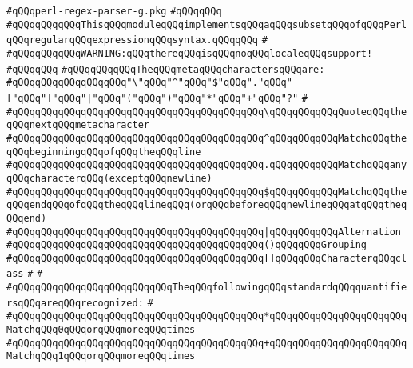 \label{src/lib/regex/front/perl-regex-parser-g.pkg}
\verb|#qQQqperl-regex-parser-g.pkg|\newline
\verb|#qQQqqQQq|\newline
\verb|#qQQqqQQqqQQqThisqQQqmoduleqQQqimplementsqQQqaqQQqsubsetqQQqofqQQqPerlqQQqregularqQQqexpressionqQQqsyntax.qQQqqQQq|\newline
\verb|#|\newline
\verb|#qQQqqQQqqQQqWARNING:qQQqthereqQQqisqQQqnoqQQqlocaleqQQqsupport!|\newline
\verb|#qQQqqQQq|\newline
\verb|#qQQqqQQqqQQqTheqQQqmetaqQQqcharactersqQQqare:|\newline
\verb|#qQQqqQQqqQQqqQQqqQQq"\"qQQq"^"qQQq"$"qQQq"."qQQq"["qQQq"]"qQQq"|\verb#|"qQQq"("qQQq")"qQQq"*"qQQq"+"qQQq"?"#\newline
\verb|#|\newline
\verb|#qQQqqQQqqQQqqQQqqQQqqQQqqQQqqQQqqQQqqQQqqQQq\qQQqqQQqqQQqQuoteqQQqtheqQQqnextqQQqmetacharacter|\newline
\verb|#qQQqqQQqqQQqqQQqqQQqqQQqqQQqqQQqqQQqqQQqqQQq^qQQqqQQqqQQqMatchqQQqtheqQQqbeginningqQQqofqQQqtheqQQqline|\newline
\verb|#qQQqqQQqqQQqqQQqqQQqqQQqqQQqqQQqqQQqqQQqqQQq.qQQqqQQqqQQqMatchqQQqanyqQQqcharacterqQQq(exceptqQQqnewline)|\newline
\verb|#qQQqqQQqqQQqqQQqqQQqqQQqqQQqqQQqqQQqqQQqqQQq$qQQqqQQqqQQqMatchqQQqtheqQQqendqQQqofqQQqtheqQQqlineqQQq(orqQQqbeforeqQQqnewlineqQQqatqQQqtheqQQqend)|\newline
\verb|#qQQqqQQqqQQqqQQqqQQqqQQqqQQqqQQqqQQqqQQqqQQq|\verb#|qQQqqQQqqQQqAlternation#\newline
\verb|#qQQqqQQqqQQqqQQqqQQqqQQqqQQqqQQqqQQqqQQqqQQq()qQQqqQQqGrouping|\newline
\verb|#qQQqqQQqqQQqqQQqqQQqqQQqqQQqqQQqqQQqqQQqqQQq[]qQQqqQQqCharacterqQQqclass|\newline
\verb|#|\newline
\verb|#|\newline
\verb|#qQQqqQQqqQQqqQQqqQQqqQQqqQQqTheqQQqfollowingqQQqstandardqQQqquantifiersqQQqareqQQqrecognized:|\newline
\verb|#|\newline
\verb|#qQQqqQQqqQQqqQQqqQQqqQQqqQQqqQQqqQQqqQQqqQQq*qQQqqQQqqQQqqQQqqQQqqQQqMatchqQQq0qQQqorqQQqmoreqQQqtimes|\newline
\verb|#qQQqqQQqqQQqqQQqqQQqqQQqqQQqqQQqqQQqqQQqqQQq+qQQqqQQqqQQqqQQqqQQqqQQqMatchqQQq1qQQqorqQQqmoreqQQqtimes|\newline
